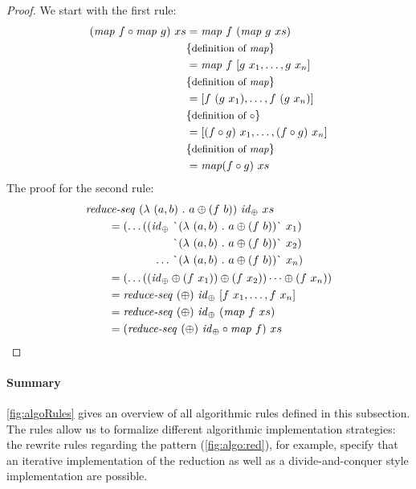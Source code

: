 \begin{proof}
  We start with the first rule:
  \begin{align*}
    (\text{\textit{map}}\ f\circ \text{\textit{map}}\ g)\ xs
      &= \text{\textit{map}}\ f\ (\text{\textit{map}}\ g\ xs)\\
      &\{\text{\small definition of \text{\textit{map}}}\}\\
      &= \text{\textit{map}}\ f\ [g\ x_1, \ldots, g\ x_n]\\
      &\{\text{\small definition of \text{\textit{map}}}\}\\
      &= [f\ (g\ x_1), \ldots, f\ (g\ x_n)]\\
      &\{\text{\small definition of $\circ$}\}\\
      &= [(f\circ g)\ x_1, \ldots, (f\circ g)\ x_n]\\
      &\{\text{\small definition of \text{\textit{map}}}\}\\
      &= \text{\textit{map}} (f\circ g)\ xs
  \end{align*}
  The proof for the second rule:
  \begin{align*}
    &\reduceSeq\ (\lambda\ (a,b)\ .\ a \oplus (f\ b))\ \id_\oplus\ xs\\
    &\qquad = 
    \begin{aligned}[t]
    (\dots ((\id_\oplus\ &\text{\`{}}(\lambda\ (a,b)\ .\ a \oplus (f\ b))\text{\`{}}\ x_1)\\
                  &\text{\`{}}(\lambda\ (a,b)\ .\ a \oplus (f\ b))\text{\`{}}\ x_2)\\
                  \ldots\ &\text{\`{}}(\lambda\ (a,b)\ .\ a \oplus (f\ b))\text{\`{}}\ x_n)
    \end{aligned}\\
    &\qquad = (\dots((\id_\oplus \oplus (f\ x_1)) \oplus (f\ x_2)) \dots \oplus (f\ x_n))\\
    &\qquad = \reduceSeq\ (\oplus)\ \id_\oplus\ [f\ x_1, \ldots, f\ x_n]\\
    &\qquad = \reduceSeq\ (\oplus)\ \id_\oplus\ (\map\ f\ xs)\\
    &\qquad = (\reduceSeq\ (\oplus)\ \id_\oplus \circ \map\ f)\ xs
  \end{align*}
\end{proof}

\paragraph{Summary}
\autoref{fig:algoRules} gives an overview of all algorithmic rules defined in this subsection.
The rules allow us to formalize different algorithmic implementation strategies:
the rewrite rules regarding the \reduce pattern (\autoref{fig:algo:red}), for example, specify that an iterative implementation of the reduction as well as a divide-and-conquer style implementation are possible.

